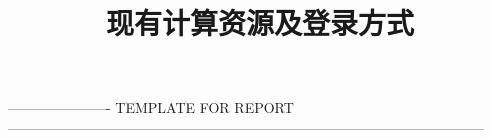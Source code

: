 ---------------------- TEMPLATE FOR REPORT ------------------------------------------------------------------------------------------------------%

\title{现有计算资源及登录方式}
\author[ ]{}   %
\renewcommand*{\Authfont}{\small\rm} %
\renewcommand*{\Affilfont}{\small\it} %
\renewcommand\Authands{ and } %
\renewcommand\Authands{ , } %
\date{} %


\maketitle

